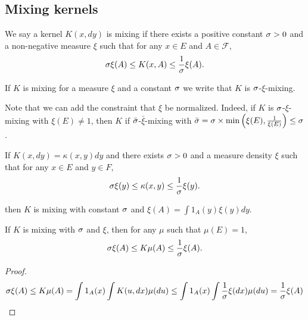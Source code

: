 \subsection{Mixing kernels}
\begin{definition}
    We say a kernel $K(x, dy)$ is mixing if there exists a positive constant $\sigma > 0$ and a non-negative measure $\xi$ such that for any $x\in E$ and $A\in\mathcal F$,
    \begin{equation}
        \sigma\xi(A) \leq K(x, A) \leq \frac{1}{\sigma}\xi(A).
    \end{equation}
\end{definition}
If $K$ is mixing for a measure $\xi$ and a constant $\sigma$ we write that $K$ is $\sigma$-$\xi$-mixing.

\begin{remark}
    Note that we can add the constraint that $\xi$ be normalized. Indeed, if $K$ is $\sigma$-$\xi$-mixing with $\xi(E)\neq 1$, then $K$ if $\bar {\sigma}$-$\bar\xi$-mixing with $\bar{\sigma} = \sigma \times \min\left(\xi(E), \frac{1}{\xi(E)}\right)\leq \sigma$.
\end{remark}

\begin{proposition}
    If $K(x, dy) = \kappa(x, y)dy$ and there exists $\sigma >0$ and a measure density $\xi$ such that for any $x\in E$ and $y\in F$,
    \begin{equation}
        \sigma\xi(y) \leq \kappa(x, y) \leq \frac{1}{\sigma}\xi(y).
    \end{equation}

    then $K$ is mixing with constant $\sigma$ and $\xi(A)=\int 1_A(y)\xi(y)dy$.
\end{proposition}

\begin{proposition}\label{prop:mixing-effect}
    If $K$ is mixing with $\sigma$ and $\xi$, then for any $\mu$ such that $\mu(E)=1$,
    \begin{equation}
        \sigma\xi(A)\leq K\mu(A)\leq \frac{1}{\sigma}\xi(A).
    \end{equation}
\end{proposition}
\begin{proof}
    \begin{equation}
    \sigma\xi(A)\leq K\mu(A)=\int 1_A(x)\int K(u, dx)\mu(du) \leq \int 1_A(x)\int \frac{1}{\sigma}\xi(dx)\mu(du)=\frac{1}{\sigma}\xi(A)
    \end{equation}
\end{proof}


